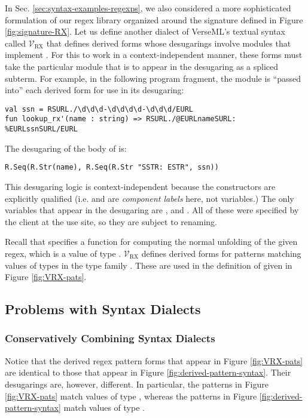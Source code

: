 {In Sec. \ref{sec:syntax-examples-regexps}, we also considered a more sophisticated formulation of our regex library organized around the signature  defined in Figure \ref{fig:signature-RX}. Let us define another dialect of VerseML's textual syntax called $\mathcal{V}_\text{RX}$ that defines derived forms whose desugarings involve modules that implement . For this to work in a  context-independent manner, these forms must take the particular module that is to appear in the desugaring as a spliced subterm. For example, in the following program fragment, the module  is ``passed into'' each derived form for use in its desugaring:
\begin{lstlisting}[numbers=none]
val ssn = RSURL./\d\d\d-\d\d\d\d-\d\d\d/EURL
fun lookup_rx'(name : string) => RSURL./@EURLnameSURL: %EURLssnSURL/EURL
\end{lstlisting}
The desugaring of the body of  is:
\begin{lstlisting}[numbers=none]
R.Seq(R.Str(name), R.Seq(R.Str "SSTR: ESTR", ssn))
\end{lstlisting}
This desugaring logic is context-independent because the constructors are explicitly qualified (i.e.  and  are \emph{component labels} here, not variables.) The only variables that appear in the desugaring are ,  and . All of these were specified by the client at the use site, so they are subject to renaming.

Recall that  specifies a function  for computing the normal unfolding of the given regex, which is a value of type . $\mathcal{V}_\text{RX}$ defines derived forms for patterns matching values of types in the type family . These are used in the definition of  given in Figure \ref{fig:VRX-pats}.




\subsection{Problems with Syntax Dialects}\label{sec:problems-with-syntax-dialects}
\subsubsection{Conservatively Combining Syntax Dialects}

Notice that the derived regex pattern forms that appear in Figure \ref{fig:VRX-pats} are identical to those that appear in Figure \ref{fig:derived-pattern-syntax}. Their desugarings are, however, different. In particular, the patterns in Figure \ref{fig:VRX-pats} match values of type , whereas the patterns in Figure \ref{fig:derived-pattern-syntax} match values of type . 

}
